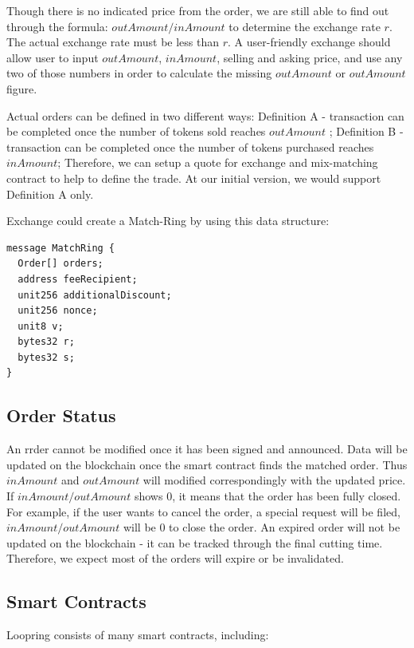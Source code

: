 \documentclass[UTF8,nofonts]{article}
\begin{document}
Though there is no indicated price from the order, we are still able to find out through the formula: $outAmount / inAmount$ to determine the exchange rate $r$. The actual exchange rate must be less than $r$. A user-friendly exchange should allow user to input $outAmount$, $inAmount$, selling and asking price, and use any two of those numbers in order to calculate the missing $outAmount$ or $outAmount$ figure.

Actual orders can be defined in two different ways: Definition A - transaction can be completed once the number of tokens sold reaches $outAmount$ ; Definition B - transaction can be completed once the number of tokens purchased reaches $inAmount$; Therefore, we can setup a quote for exchange and mix-matching contract to help to define the trade. At our initial version, we would support Definition A only.

Exchange could create a Match-Ring by using this data structure:
\begin{verbatim}
message MatchRing {
  Order[] orders;
  address feeRecipient;
  unit256 additionalDiscount;
  unit256 nonce;
  unit8 v;
  bytes32 r;
  bytes32 s;
}
\end{verbatim}


\subsection{Order Status\label{sec: orderstate}}


An rrder cannot be modified once it has been signed and announced. Data will be updated on the blockchain once the smart contract finds the matched order. Thus $inAmount$ and $outAmount$ will modified correspondingly with the updated price. If $inAmount / outAmount$ shows 0,  it means that the order has been fully closed. For example, if the user wants to cancel the order, a special request will be filed,  $inAmount / outAmount$ will be 0 to close the order. An expired order will not be updated on the blockchain - it can be tracked through the final cutting time. Therefore, we expect most of the orders will expire or be invalidated.

\subsection{Smart Contracts\label{sec: contracts}}

Loopring consists of many smart contracts, including:
\end{document}
